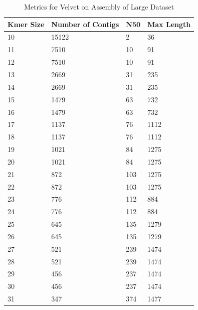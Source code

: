 \documentclass[12pt]{article}
\begin{document}
\begin{table}[p]
\centering
\begin{tabular}{|l|l|l|l|}
\hline
Kmer Size &Number of Contigs &N50 &Max Length\\\hline
10 &15122 &2 &36 \\
11 &7510 &10 &91 \\
12 &7510 &10 &91 \\
13 &2669 &31 &235 \\
14 &2669 &31 &235 \\
15 &1479 &63 &732 \\
16 &1479 &63 &732 \\
17 &1137 &76 &1112 \\
18 &1137 &76 &1112 \\
19 &1021 &84 &1275 \\
20 &1021 &84 &1275 \\
21 &872 &103 &1275 \\
22 &872 &103 &1275 \\
23 &776 &112 &884 \\
24 &776 &112 &884 \\
25 &645 &135 &1279 \\
26 &645 &135 &1279 \\
27 &521 &239 &1474 \\
28 &521 &239 &1474 \\
29 &456 &237 &1474 \\
30 &456 &237 &1474 \\
31 &347 &374 &1477\\\hline
\end{tabular}
\caption{Metrics for Velvet on Assembly of Large Dataset}
\label{table:Velvet}
\end{table}
\end{document}
